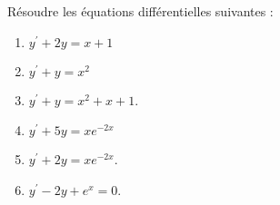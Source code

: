 \documentclass[a4paper, 11pt]{article}
\begin{document}
\begin{itemize}
{\footnotesize \begin{exercice} 
R\'esoudre les \'equations diff\'erentielles suivantes :
\begin{enumerate}

\item $y^{\prime}+2y=x+1$
\item $y^{\prime}+y=x^2$
\item $y^{\prime}+y=x^2+x+1$.
 

\item $y^{\prime}+5y=xe^{-2x}$
\item $y^{\prime}+2y=xe^{-2x}$.
\item $y^{\prime}-2y+e^x=0$.
 
\end{enumerate}
\end{exercice}
}


%
%
%

\end{itemize}
%
\end{document}
